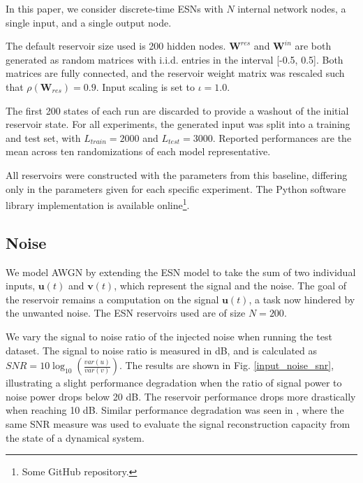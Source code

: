 In this paper, we consider discrete-time ESNs with $N$ internal network nodes, a
single input, and a single output node.

The default reservoir size used is 200 hidden nodes. $\mathbf{W}^{res}$ and
$\mathbf{W}^{in}$ are both generated as random matrices with i.i.d. entries in
the interval [-0.5, 0.5]. Both matrices are fully connected, and the reservoir
weight matrix was rescaled such that $\rho(\mathbf{W}_{res}) = 0.9$.  Input
scaling is set to $\iota = 1.0$.

The first 200 states of each run are discarded to provide a washout of the
initial reservoir state. For all experiments, the generated input was split into
a training and test set, with $L_{train} = 2000$ and $L_{test} = 3000$. Reported
performances are the mean across ten randomizations of each model
representative.

All reservoirs were constructed with the parameters from this baseline,
differing only in the parameters given for each specific experiment. The Python
software library implementation is available online\footnote{Some GitHub
repository.}.


\subsection{Noise}

We model AWGN by extending the ESN model to take the sum of two individual
inputs, $\mathbf{u}(t)$ and $\mathbf{v}(t)$, which represent the signal and the
noise. The goal of the reservoir remains a computation on the signal
$\mathbf{u}(t)$, a task now hindered by the unwanted noise. The ESN reservoirs
used are of size $N = 200$.

We vary the signal to noise ratio of the injected noise when running the test
dataset. The signal to noise ratio is measured in dB, and is calculated as $SNR
= 10\log_{10}(\frac{var(u)}{var(v)})$. The results are shown in
Fig. \ref{input_noise_snr}, illustrating a slight performance degradation when
the ratio of signal power to noise power drops below 20 dB. The reservoir
performance drops more drastically when reaching 10 dB. Similar performance
degradation was seen in \cite{dambre_information_2012}, where the same SNR
measure was used to evaluate the signal reconstruction capacity from the state
of a dynamical system.

